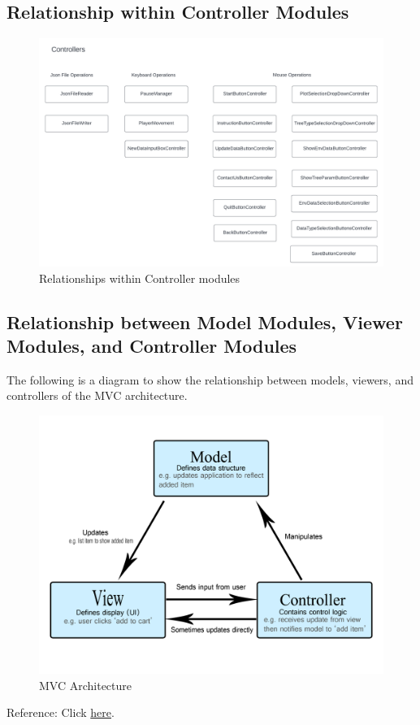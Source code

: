 \documentclass[12pt, titlepage]{article}
\begin{document}
\newpage

\subsection{Relationship within Controller Modules} \label{SecRBCM}
\begin{figure}[H]
\centering
\caption{Relationships within Controller modules}
\label{FigRelaControllers}
\includegraphics[scale=0.65]{Controller-Modules.png}
\end{figure}

\newpage

\subsection{Relationship between Model Modules, Viewer Modules, and Controller Modules} \label{SecRBMVC}
The following is a diagram to show the relationship between models, viewers, and controllers
of the MVC architecture.
\begin{figure}[H]
\centering
\caption{MVC Architecture}
\label{MVCArchitecture}
\includegraphics[scale=0.8]{MVC.png}
\end{figure}
\noindent Reference: Click \href{https://developer.mozilla.org/en-US/docs/Glossary/MVC}{here}.
\end{document}

